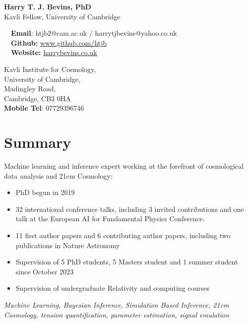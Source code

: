\documentclass{article}
\begin{document}
\small

\begin{center}
\Large
\textbf{Harry T. J. Bevins, PhD}\\
\large
Kavli Fellow, University of Cambridge
\end{center}

\begin{minipage}[ht]{0.6\linewidth}
	\faEnvelope~~\textbf{Email}: htjb2@cam.ac.uk / harrytjbevins@yahoo.co.uk\\
	\faGithub~~\textbf{Github:} \url{www.github.com/htjb}\\
	\faGlobe~~\textbf{Website:} \url{harrybevins.co.uk}
\end{minipage}
\begin{minipage}[ht]{0.3\linewidth}
	\begin{flushright}
	Kavli Institute for Cosmology, \\
    University of Cambridge,\\
    Madingley Road,\\
    Cambridge, CB3 0HA\\
    \textbf{Mobile Tel}: 07729396746 \\
	\end{flushright}
\end{minipage}

\section*{Summary}

Machine learning and inference expert working at the forefront of cosmological data analysis and 21cm Cosmology:
\begin{itemize}
    \item PhD begun in 2019
    \item 32 international conference talks, including 3 invited contributions and one talk at the European AI for Fundamental Physics Conference.
    \item 11 first author papers and 6 contributing author papers, including two publications in Nature Astronomy
    \item Supervision of 5 PhD students, 5 Masters student and 1 summer student since October 2023
    \item Supervision of undergraduate Relativity and computing courses
    
\end{itemize}

\textit{Machine Learning, Bayesian Inference, Simulation Based Inference, 21cm Cosmology, tension quantification, parameter estimation, signal emulation}
\end{document}
